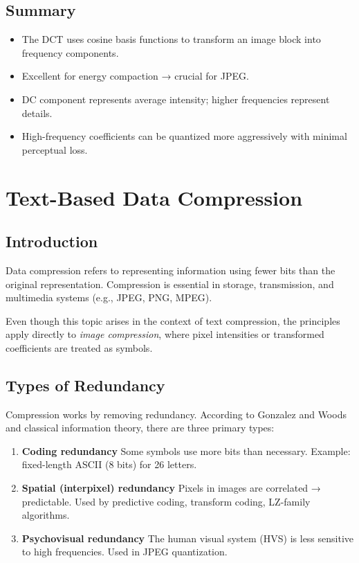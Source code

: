 \documentclass{AnantDocumentation}
\begin{document}
\subsection{Summary}

\begin{itemize}
\item The DCT uses cosine basis functions to transform an image block into frequency components.
\item Excellent for energy compaction → crucial for JPEG.
\item DC component represents average intensity; higher frequencies represent details.
\item High-frequency coefficients can be quantized more aggressively with minimal perceptual loss.
\end{itemize}

\section{Text-Based Data Compression}

\subsection{Introduction}

Data compression refers to representing information using fewer bits than the original representation.  
Compression is essential in storage, transmission, and multimedia systems (e.g., JPEG, PNG, MPEG).  

Even though this topic arises in the context of text compression, the principles apply directly to \emph{image compression}, where pixel intensities or transformed coefficients are treated as symbols.

\subsection{Types of Redundancy}

Compression works by removing redundancy. According to Gonzalez and Woods and classical information theory, there are three primary types:

\begin{enumerate}
\item \textbf{Coding redundancy}  
Some symbols use more bits than necessary.  
Example: fixed-length ASCII (8 bits) for 26 letters.

\item \textbf{Spatial (interpixel) redundancy}  
Pixels in images are correlated → predictable.  
Used by predictive coding, transform coding, LZ-family algorithms.

\item \textbf{Psychovisual redundancy}  
The human visual system (HVS) is less sensitive to high frequencies.  
Used in JPEG quantization.
\end{enumerate}
\end{document}
